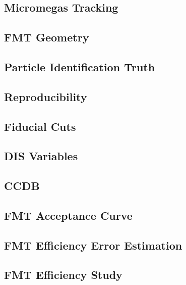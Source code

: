 \subsection*{Micromegas Tracking}


\subsection*{FMT Geometry}


\subsection*{Particle Identification Truth}


\subsection*{Reproducibility}


\subsection*{Fiducial Cuts}


\subsection*{DIS Variables}


\subsection*{CCDB}


\subsection*{FMT Acceptance Curve}


\subsection*{FMT Efficiency Error Estimation}


\subsection*{FMT Efficiency Study}


